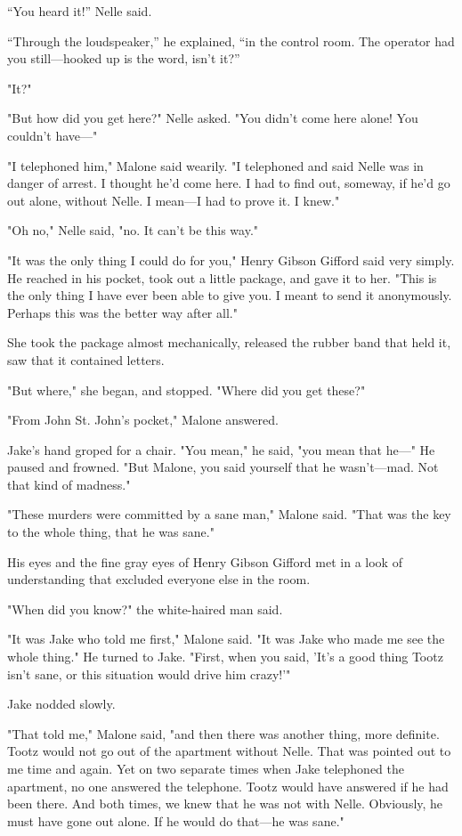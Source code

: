 \documentclass{novel}
\begin{document}
“You heard it!” Nelle said.

“Through the loudspeaker,” he explained, “in the control room. The operator had you still—hooked up is the word, isn’t it?”

"It?"

"But how did you get here?" Nelle asked. "You didn’t come here alone! You couldn’t have—"

"I telephoned him," Malone said wearily. "I telephoned and said Nelle was in danger of arrest. I thought he’d come here. I had to find out, someway, if he’d go out alone, without Nelle. I mean—I had to prove it. I knew."

"Oh no," Nelle said, "no. It can’t be this way."

"It was the only thing I could do for you," Henry Gibson Gifford said very simply. He reached in his pocket, took out a little package, and gave it to her. "This is the only thing I have ever been able to give you. I meant to send it anonymously. Perhaps this was the better way after all."

She took the package almost mechanically, released the rubber band that held it, saw that it contained letters.

"But where," she began, and stopped. "Where did you get these?"

"From John St. John’s pocket," Malone answered.

Jake’s hand groped for a chair. "You mean," he said, "you mean that he—" He paused and frowned. "But Malone, you said yourself that he wasn’t—mad. Not that kind of madness."

"These murders were committed by a sane man," Malone said. "That was the key to the whole thing, that he was sane."

His eyes and the fine gray eyes of Henry Gibson Gifford met in a look of understanding that excluded everyone else in the room.

"When did you know?" the white-haired man said.

"It was Jake who told me first," Malone said. "It was Jake who made me see the whole thing." He turned to Jake. "First, when you said, 'It’s a good thing Tootz isn’t sane, or this situation would drive him crazy!'"

Jake nodded slowly.

"That told me," Malone said, "and then there was another thing, more definite. Tootz would not go out of the apartment without Nelle. That was pointed out to me time and again. Yet on two separate times when Jake telephoned the apartment, no one answered the telephone. Tootz would have answered if he had been there. And both times, we knew that he was not with Nelle. Obviously, he must have gone out alone. If he would do that—he was sane."
\end{document}
